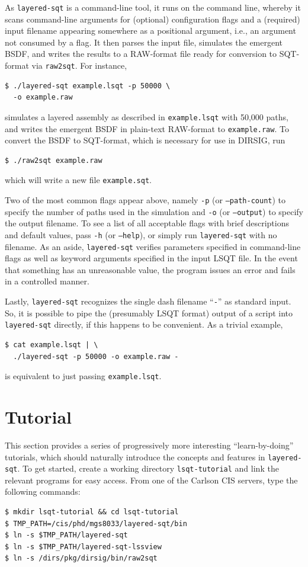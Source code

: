 \documentclass[
    twoside,
    twocolumn,
    letterpaper,
    10pt]{article}
\begin{document}
As \texttt{layered-sqt} is a command-line tool, it runs
on the command line, whereby it scans command-line arguments for
(optional) configuration flags and a (required) input filename
appearing somewhere as a positional argument, i.e., an argument 
not consumed by a flag. It then parses the input file, simulates 
the emergent BSDF,
and writes the results to a RAW-format file ready for conversion to
SQT-format via \texttt{raw2sqt}. For instance, 
\begin{verbatim}
$ ./layered-sqt example.lsqt -p 50000 \
  -o example.raw
\end{verbatim}
simulates a layered assembly as described in \texttt{example.lsqt} 
with 50,000 paths, and writes the emergent BSDF in plain-text RAW-format to
\texttt{example.raw}. To convert the BSDF to SQT-format, which is necessary
for use in DIRSIG, run
\begin{verbatim}
$ ./raw2sqt example.raw
\end{verbatim}
which will write a new file \texttt{example.sqt}.

Two of the most common flags appear above, namely
\texttt{-p} (or \texttt{--path-count}) to specify the number of paths used in
the simulation and \texttt{-o} (or \texttt{--output}) to specify the output 
filename. To see a list of all acceptable flags with brief descriptions and 
default values, pass \texttt{-h} (or \texttt{--help}), or simply run 
\texttt{layered-sqt} with no filename. As an aside,
\texttt{layered-sqt} verifies parameters specified in command-line flags
as well as keyword arguments specified in the input LSQT file.
In the event that something has an unreasonable value, the program
issues an error and fails in a controlled manner.

Lastly, \texttt{layered-sqt} recognizes the single dash filename 
``\texttt{-}'' as standard input. So, it is possible to pipe the 
(presumably LSQT format) output of a script into \texttt{layered-sqt} 
directly, if this happens to be convenient. As a trivial example,
\begin{verbatim}
$ cat example.lsqt | \
  ./layered-sqt -p 50000 -o example.raw -
\end{verbatim}
is equivalent to just passing \texttt{example.lsqt}.

\section{Tutorial}

This section provides a series of progressively more interesting
``learn-by-doing'' tutorials, which should naturally introduce the
concepts and features in \texttt{layered-sqt}. To get started, create
a working directory \texttt{lsqt-tutorial} and link the relevant programs
for easy access. From one of the Carlson CIS servers, 
type the following commands:
\begin{verbatim}
$ mkdir lsqt-tutorial && cd lsqt-tutorial
$ TMP_PATH=/cis/phd/mgs8033/layered-sqt/bin
$ ln -s $TMP_PATH/layered-sqt
$ ln -s $TMP_PATH/layered-sqt-lssview
$ ln -s /dirs/pkg/dirsig/bin/raw2sqt
\end{verbatim}
\end{document}

